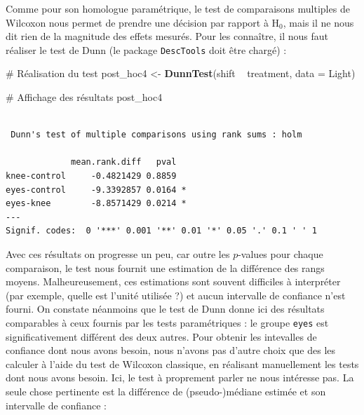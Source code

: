 \documentclass[a4paperpaper,]{article}
\newenvironment{Shaded}{\begin{snugshade}}{\end{snugshade}}
\newcommand{\CommentTok}[1]{\textcolor[rgb]{0.54,0.53,0.53}{#1}}
\newcommand{\DataTypeTok}[1]{\textcolor[rgb]{0.00,0.34,0.68}{#1}}
\newcommand{\KeywordTok}[1]{\textcolor[rgb]{0.12,0.11,0.11}{\textbf{#1}}}
\newcommand{\NormalTok}[1]{\textcolor[rgb]{0.12,0.11,0.11}{#1}}
\newcommand{\OperatorTok}[1]{\textcolor[rgb]{0.12,0.11,0.11}{#1}}
\newcommand{\OtherTok}[1]{\textcolor[rgb]{0.00,0.43,0.16}{#1}}
\newcommand{\StringTok}[1]{\textcolor[rgb]{0.75,0.01,0.01}{#1}}
\begin{document}
Comme pour son homologue paramétrique, le test de comparaisons multiples de Wilcoxon nous permet de prendre une décision par rapport à H\(_0\), mais il ne nous dit rien de la magnitude des effets mesurés. Pour les connaître, il nous faut réaliser le test de Dunn (le package \texttt{DescTools} doit être chargé) :

\begin{Shaded}
\begin{Highlighting}[]
\CommentTok{# Réalisation du test}
\NormalTok{post_hoc4 <-}\StringTok{ }\KeywordTok{DunnTest}\NormalTok{(shift }\OperatorTok{~}\StringTok{ }\NormalTok{treatment, }\DataTypeTok{data =}\NormalTok{ Light)}

\CommentTok{# Affichage des résultats}
\NormalTok{post_hoc4}
\end{Highlighting}
\end{Shaded}

\begin{verbatim}

 Dunn's test of multiple comparisons using rank sums : holm  

             mean.rank.diff   pval    
knee-control     -0.4821429 0.8859    
eyes-control     -9.3392857 0.0164 *  
eyes-knee        -8.8571429 0.0214 *  
---
Signif. codes:  0 '***' 0.001 '**' 0.01 '*' 0.05 '.' 0.1 ' ' 1
\end{verbatim}

Avec ces résultats on progresse un peu, car outre les \(p\)-values pour chaque comparaison, le test nous fournit une estimation de la différence des rangs moyens. Malheureusement, ces estimations sont souvent difficiles à interpréter (par exemple, quelle est l'unité utilisée ?) et aucun intervalle de confiance n'est fourni. On constate néanmoins que le test de Dunn donne ici des résultats comparables à ceux fournis par les tests paramétriques : le groupe \texttt{eyes} est significativement différent des deux autres. Pour obtenir les intevalles de confiance dont nous avons besoin, nous n'avons pas d'autre choix que des les calculer à l'aide du test de Wilcoxon classique, en réalisant manuellement les tests dont nous avons besoin. Ici, le test à proprement parler ne nous intéresse pas. La seule chose pertinente est la différence de (pseudo-)médiane estimée et son intervalle de confiance :

\begin{Shaded}
\end{Shaded}
\end{document}

